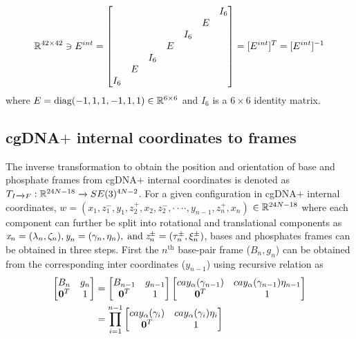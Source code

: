 \begin{equation}
{\mathbb R}^{42\times42} \ni E^{int} =  
\begin{bmatrix}
&&&&&&I_6 \\
&&&&&E& \\
&&&&I_6&& \\
&&&E&&& \\
&&I_6&&&& \\
&E&&&&& \\
I_6&&&&&& \\
\end{bmatrix}
= [E^{int}]^T= [E^{int}]^{-1}
\label{Ematint}
\end{equation}
where $E = \text{diag}(-1,1,1,-1,1,1) \in {\mathbb R}^{6\times6}$ and $I_6$ is a $6\times6$ identity matrix. 

\subsection{cgDNA$+$ internal coordinates to frames}\label{c2:s2sb2}
The inverse transformation to obtain the position and orientation of base and phosphate frames from cgDNA$+$ internal coordinates is denoted as $T_{I\xrightarrow{}F} : {\mathbb R}^{24N-18}  \xrightarrow{} SE(3)^{4N-2}$.
For a given configuration in cgDNA$+$ internal coordinates,
$w = (\textit{x}_1,\textit{z}_1^{-},\textit{y}_1,\textit{z}_2^{+}, \textit{x}_2,\textit{z}_2^{-},\cdot \cdot \cdot \cdot,  \textit{y}_{n-1},\textit{z}_n^{+}, \textit{x}_n)$ $\in {\mathbb R}^{24N-18}$ where each component can further be split into rotational and translational components as $\textit{x}_n = (\lambda_{n},\zeta_{n}), \textit{y}_n = (\gamma_{n}, \eta_{n}), {\;\text{and\;}} \textit{z}_n^\pm =  (\tau_n^\pm, \xi_n^\pm)$, bases and phosphates frames can be obtained in three steps.
First the $n^{\text{th}}$ base-pair frame ($B_n,g_n$) can be obtained from the corresponding inter coordinates ($\textit{y}_{n-1}$) using recursive relation as  
\begin{equation}
\begin{split}
\begin{bmatrix}
B_{n} & g_{n} \\
\mathbf{0}^T & 1 
\end{bmatrix} 
&=
\begin{bmatrix}
B_{n-1} & g_{n-1} \\
\mathbf{0}^T & 1 
\end{bmatrix} 
\begin{bmatrix}
cay_{\alpha}(\gamma_{n-1}) & cay_{\alpha}(\gamma_{n-1})\eta_{n-1} \\
\mathbf{0}^T & 1 
\end{bmatrix} \\
&=
\prod_{i=1}^{n-1}
\begin{bmatrix}
cay_{\alpha}(\gamma_{i}) & cay_{\alpha}(\gamma_{i})\eta_{i} \\
\mathbf{0}^T & 1 
\end{bmatrix} 
\end{split}
\end{equation}
